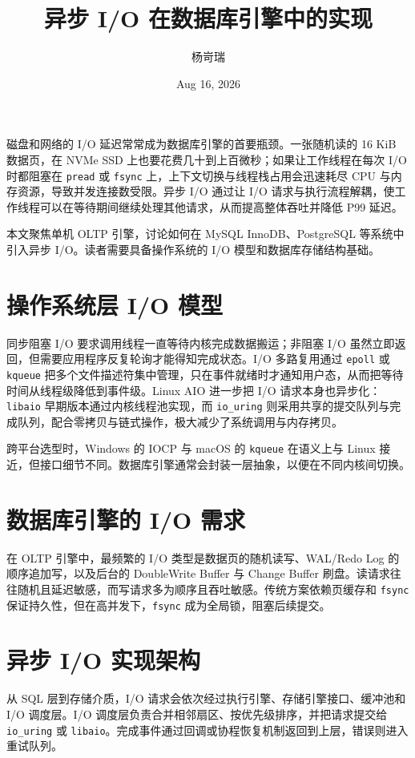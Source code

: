 \title{异步 I/O 在数据库引擎中的实现}
\author{杨岢瑞}
\date{Aug 16, 2026}
\maketitle
磁盘和网络的 I/O 延迟常常成为数据库引擎的首要瓶颈。一张随机读的 16 KiB 数据页，在 NVMe SSD 上也要花费几十到上百微秒；如果让工作线程在每次 I/O 时都阻塞在 \texttt{pread} 或 \texttt{fsync} 上，上下文切换与线程栈占用会迅速耗尽 CPU 与内存资源，导致并发连接数受限。异步 I/O 通过让 I/O 请求与执行流程解耦，使工作线程可以在等待期间继续处理其他请求，从而提高整体吞吐并降低 P99 延迟。\par
本文聚焦单机 OLTP 引擎，讨论如何在 MySQL InnoDB、PostgreSQL 等系统中引入异步 I/O。读者需要具备操作系统的 I/O 模型和数据库存储结构基础。\par
\chapter{操作系统层 I/O 模型}
同步阻塞 I/O 要求调用线程一直等待内核完成数据搬运；非阻塞 I/O 虽然立即返回，但需要应用程序反复轮询才能得知完成状态。I/O 多路复用通过 \texttt{epoll} 或 \texttt{kqueue} 把多个文件描述符集中管理，只在事件就绪时才通知用户态，从而把等待时间从线程级降低到事件级。Linux AIO 进一步把 I/O 请求本身也异步化：\texttt{libaio} 早期版本通过内核线程池实现，而 \texttt{io\_{}uring} 则采用共享的提交队列与完成队列，配合零拷贝与链式操作，极大减少了系统调用与内存拷贝。\par
跨平台选型时，Windows 的 IOCP 与 macOS 的 \texttt{kqueue} 在语义上与 Linux 接近，但接口细节不同。数据库引擎通常会封装一层抽象，以便在不同内核间切换。\par
\chapter{数据库引擎的 I/O 需求}
在 OLTP 引擎中，最频繁的 I/O 类型是数据页的随机读写、WAL/Redo Log 的顺序追加写，以及后台的 DoubleWrite Buffer 与 Change Buffer 刷盘。读请求往往随机且延迟敏感，而写请求多为顺序且吞吐敏感。传统方案依赖页缓存和 \texttt{fsync} 保证持久性，但在高并发下，\texttt{fsync} 成为全局锁，阻塞后续提交。\par
\chapter{异步 I/O 实现架构}
从 SQL 层到存储介质，I/O 请求会依次经过执行引擎、存储引擎接口、缓冲池和 I/O 调度层。I/O 调度层负责合并相邻扇区、按优先级排序，并把请求提交给 \texttt{io\_{}uring} 或 \texttt{libaio}。完成事件通过回调或协程恢复机制返回到上层，错误则进入重试队列。\par

